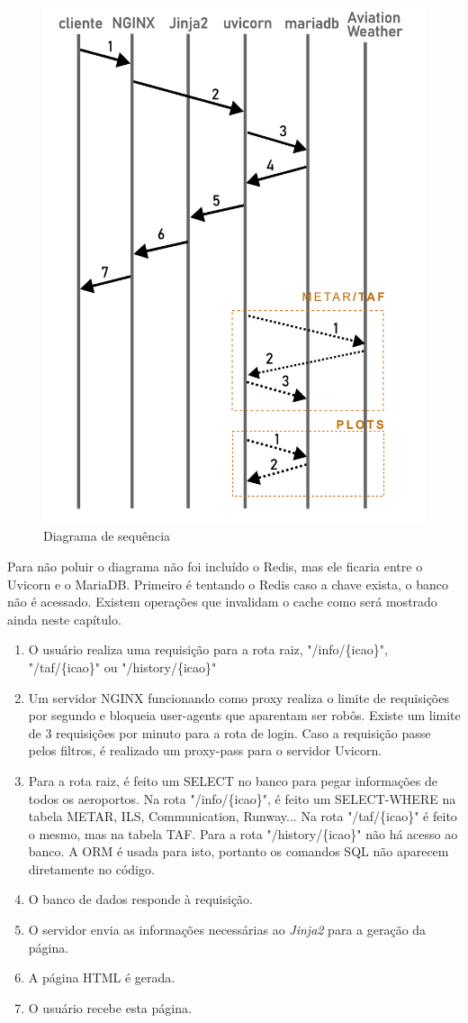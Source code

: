 \begin{figure}[H]
    \begin{center}
    \includegraphics[width=0.5\linewidth]{img/diagrama-tempo.png}
    \caption{Diagrama de sequência}
    \label{fig:tempo}
    \end{center}
\end{figure}

Para não poluir o diagrama não foi incluído o Redis, mas ele ficaria entre
o Uvicorn e o MariaDB. Primeiro é tentando o Redis caso a chave exista, o banco
não é acessado. Existem operações que invalidam o cache como será mostrado
ainda neste capítulo.

\begin{enumerate}
\item O usuário realiza uma requisição para a rota raiz, "/info/\{icao\}", "/taf/\{icao\}"
ou "/history/\{icao\}"
\item Um servidor NGINX funcionando como proxy realiza o limite de requisições por segundo
e bloqueia user-agents que aparentam ser robôs. Existe um limite de 3 requisições por
minuto para a rota de login. Caso a requisição passe pelos filtros, é
realizado um proxy-pass para o servidor Uvicorn.
\item Para a rota raiz, é feito um SELECT no banco para pegar informações de todos os
aeroportos. Na rota "/info/\{icao\}", é feito um SELECT-WHERE na tabela METAR, ILS, Communication, Runway...
Na rota "/taf/\{icao\}" é feito o mesmo, mas na tabela TAF. Para a rota "/history/\{icao\}"
não há acesso ao banco.
A ORM é usada para isto, portanto os comandos SQL não aparecem diretamente no código.
\item O banco de dados responde à requisição.
\item O servidor envia as informações necessárias ao \textit{Jinja2} para a geração da página.
\item A página HTML é gerada.
\item O usuário recebe esta página.
\end{enumerate}

